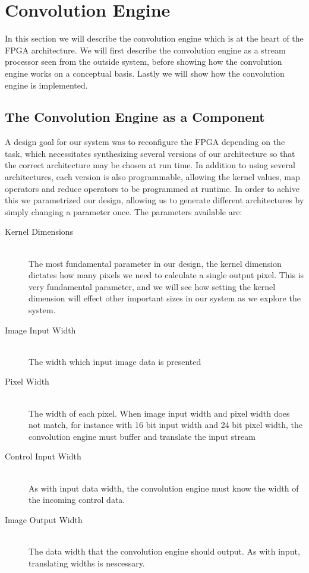 \section{Convolution Engine}
\label{sec:processor}
In this section we will describe the convolution engine which is at the heart of the FPGA architecture.
We will first describe the convolution engine as a stream processor seen from the outside system, before showing how the convolution engine works on a conceptual basis.
Lastly we will show how the convolution engine is implemented.

\subsection{The Convolution Engine as a Component}
A design goal for our system was to reconfigure the FPGA depending on the task, which necessitates synthesizing several versions of our architecture so that the correct architecture may be chosen at run time.
In addition to using several architectures, each version is also programmable, allowing the kernel values, map operators and reduce operators to be programmed at runtime.
In order to achive this we parametrized our design, allowing us to generate different architectures by simply changing a parameter once.
The parameters available are:

\begin{description}
    \item[Kernel Dimensions] \hfill \\
        The most fundamental parameter in our design, the kernel dimension dictates how many pixels we need to calculate a single output pixel.
        This is very fundamental parameter, and we will see how setting the kernel dimension will effect other important sizes in our system as we explore the system.
    \item[Image Input Width] \hfill \\
        The width which input image data is presented 
    \item[Pixel Width] \hfill \\
        The width of each pixel. When image input width and pixel width does not match, for instance with 16 bit input width and 24 bit pixel width, the convolution engine must buffer and translate the input stream 
    \item[Control Input Width] \hfill \\
        As with input data width, the convolution engine must know the width of the incoming control data.
    \item[Image Output Width] \hfill \\
        The data width that the convolution engine should output. As with input, translating widths is nescessary.
\end{description}

